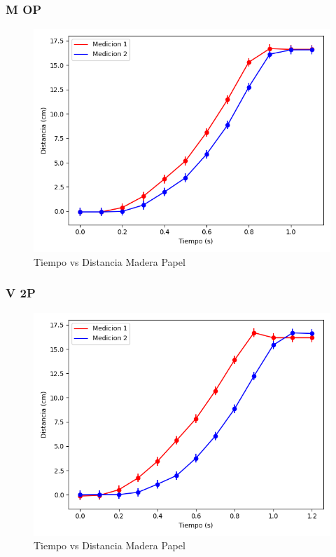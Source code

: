\documentclass[12pt,a4]{article}
\begin{document}
\subsubsection{M OP}

\begin{figure}[H]
    \centering
    \includegraphics[width=0.9\linewidth]{TiempoVsDistanciaPisoHojaM_OP.png}
    \caption{Tiempo vs Distancia Madera Papel}
    \label{fig:TvDM_OP piso hoja}
\end{figure}

\subsubsection{V 2P}

\begin{figure}[H]
    \centering
    \includegraphics[width=0.9\linewidth]{TiempoVsDistanciaPisoHojaV_2P.png}
    \caption{Tiempo vs Distancia Madera Papel}
    \label{fig:TvDV_2P piso hoja}
\end{figure}
\end{document}
